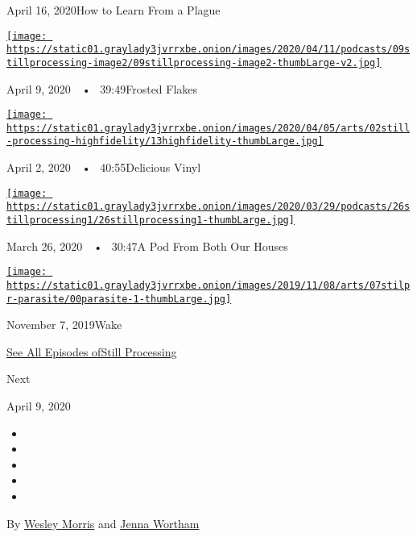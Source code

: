 April 16, 2020How to Learn From a Plague

\href{https://www.nytimes3xbfgragh.onion/2020/04/09/podcasts/still-processing-tiger-king.html?action=click\&module=audio-series-bar\&region=header\&pgtype=Article}{\texttt{[image: https://static01.graylady3jvrrxbe.onion/images/2020/04/11/podcasts/09stillprocessing-image2/09stillprocessing-image2-thumbLarge-v2.jpg]}}

April 9, 2020~~•~ 39:49Frosted Flakes

\href{https://www.nytimes3xbfgragh.onion/2020/04/02/podcasts/high-fidelity-zoe-kravitz.html?action=click\&module=audio-series-bar\&region=header\&pgtype=Article}{\texttt{[image: https://static01.graylady3jvrrxbe.onion/images/2020/04/05/arts/02still-processing-highfidelity/13highfidelity-thumbLarge.jpg]}}

April 2, 2020~~•~ 40:55Delicious Vinyl

\href{https://www.nytimes3xbfgragh.onion/2020/03/26/podcasts/still-processing-quarantine.html?action=click\&module=audio-series-bar\&region=header\&pgtype=Article}{\texttt{[image: https://static01.graylady3jvrrxbe.onion/images/2020/03/29/podcasts/26stillprocessing1/26stillprocessing1-thumbLarge.jpg]}}

March 26, 2020~~•~ 30:47A Pod From Both Our Houses

\href{https://www.nytimes3xbfgragh.onion/2019/11/07/podcasts/still-processing-parasite-watchmen-bong-joon-ho.html?action=click\&module=audio-series-bar\&region=header\&pgtype=Article}{\texttt{[image: https://static01.graylady3jvrrxbe.onion/images/2019/11/08/arts/07stilpr-parasite/00parasite-1-thumbLarge.jpg]}}

November 7, 2019Wake

\href{https://www.nytimes3xbfgragh.onion/column/still-processing-podcast}{See
All Episodes ofStill Processing}

Next

April 9, 2020

\begin{itemize}
\item
\item
\item
\item
\item
\end{itemize}

By \href{https://www.nytimes3xbfgragh.onion/by/wesley-morris}{Wesley
Morris} and
\href{https://www.nytimes3xbfgragh.onion/by/jenna-wortham}{Jenna
Wortham}

